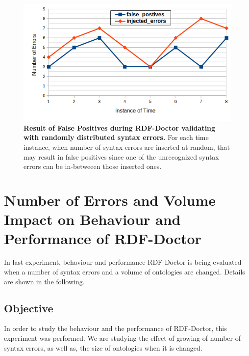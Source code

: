 	\begin{figure}[ht]
	\begin{center}
		\includegraphics[scale=0.7,angle=0]{images/Experiment02-03.png}
				\setlength\belowcaptionskip{-5mm}

		\caption{\textbf{Result of False Positives during RDF-Doctor validating with randomly distributed syntax errors.} For each time instance, when number of syntax errors are inserted at random, that may result in false positives since one of the unrecognized syntax errors can be in-betweeen those inserted ones.} 
		\label{Fig:Experiment02-03}
				\setlength\belowcaptionskip{-5mm}
		\setlength\abovecaptionskip{0mm}
	\end{center}
\end{figure}

\section{Number of Errors and Volume Impact on Behaviour and  Performance of RDF-Doctor}
In last experiment, behaviour and  performance RDF-Doctor is being evaluated when a number of syntax errors and a volume of ontologies are changed. Details are shown in the following.  
\subsection{Objective}

In order to study the behaviour and the performance of RDF-Doctor, this experiment was performed. We are studying the effect of growing of number of syntax errors, as well as, the size of ontologies when it is changed. 


